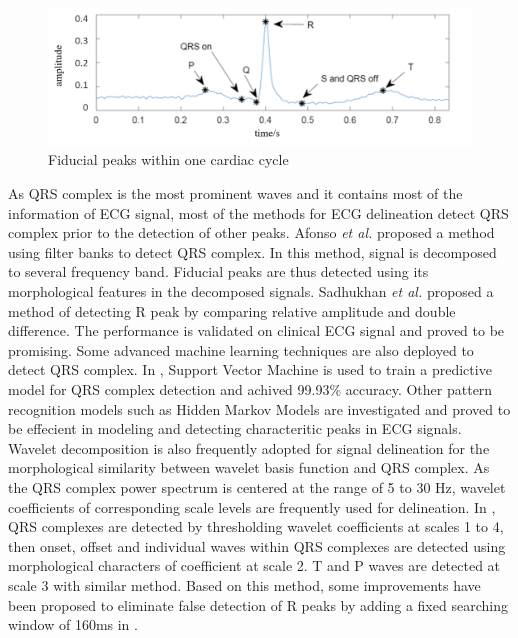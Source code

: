  \begin{figure}[thpb]
 	\centering
 	\includegraphics[scale=0.7]{Fig/fiducial_peaks.png}  
 	\caption{Fiducial peaks within one cardiac cycle}
 	\label{fig:fiducial_peaks}
 \end{figure}
 
As QRS complex is the most prominent waves and it contains most of the information of ECG signal, most of the methods for ECG delineation detect QRS complex prior to the detection of other peaks. Afonso \textit{et al.} \cite{afonso1999ecg} proposed a method using filter banks to detect QRS complex. In this method, signal is decomposed to several frequency band. Fiducial peaks are thus detected using its morphological features in the decomposed signals. Sadhukhan \textit{et al.} \cite{sadhukhan2012r} proposed a method of detecting R peak by comparing relative amplitude and double difference. The performance is validated on clinical ECG signal and proved to be promising. Some advanced machine learning techniques are also deployed to detect QRS complex. In \cite{mehta2008svm}, Support Vector Machine is used to train a predictive model for QRS complex detection and achived 99.93\% accuracy. Other pattern recognition models such as Hidden Markov Models are investigated and proved to be effecient in modeling and detecting characteritic peaks in ECG signals\cite{andreao2006ecg}. Wavelet decomposition is also frequently adopted for signal delineation for the morphological similarity between wavelet basis function and QRS complex. As the QRS complex power spectrum is centered at the range of 5 to 30 Hz, wavelet coefficients of corresponding scale levels are frequently used for delineation. In \cite{martinez2004wavelet}, QRS complexes are detected by thresholding wavelet coefficients at scales 1 to 4, then onset, offset and individual waves within QRS complexes are detected using morphological characters of coefficient at scale 2. T and P waves are detected at scale 3 with similar method. Based on this method, some improvements have been proposed to eliminate false detection of R peaks by adding a fixed searching window of 160ms in \cite{banerjee2012delineation}. 

